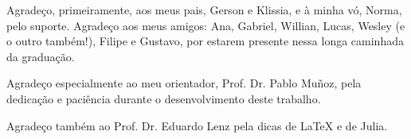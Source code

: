 

\begin{agradecimentos}
    Agradeço, primeiramente, aos meus pais, Gerson e Klissia, e à minha vó, Norma, pelo suporte. 
    Agradeço aos meus amigos: Ana, Gabriel, Willian, Lucas, Wesley (e o outro também!), Filipe e Gustavo, por estarem presente nessa longa caminhada da graduação.
    
    Agradeço especialmente ao meu orientador, Prof. Dr. Pablo Muñoz, pela dedicação e paciência durante o desenvolvimento deste trabalho.

    Agradeço também ao Prof. Dr. Eduardo Lenz pela dicas de \LaTeX{} e de Julia.
\end{agradecimentos}
